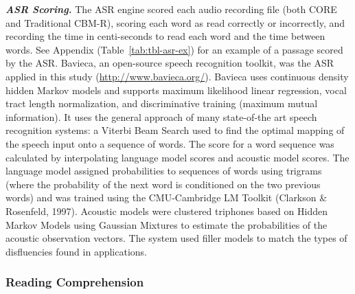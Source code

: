\documentclass[
  english,
  man, fleqn, noextraspace]{apa6}
\begin{document}
\begin{center}
\begin{ThreePartTable}
\end{ThreePartTable}
\end{center}




\textbf{\emph{ASR Scoring.}} The ASR engine scored each audio recording file (both CORE and Traditional CBM-R), scoring each word as read correctly or incorrectly, and recording the time in centi-seconds to read each word and the time between words. See Appendix (Table~\ref{tab:tbl-asr-ex}) for an example of a passage scored by the ASR. Bavieca, an open-source speech recognition toolkit, was the ASR applied in this study (\url{http://www.bavieca.org/}). Bavieca uses continuous density hidden Markov models and supports maximum likelihood linear regression, vocal tract length normalization, and discriminative training (maximum mutual information). It uses the general approach of many state-of-the art speech recognition systems: a Viterbi Beam Search used to find the optimal mapping of the speech input onto a sequence of words. The score for a word sequence was calculated by interpolating language model scores and acoustic model scores. The language model assigned probabilities to sequences of words using trigrams (where the probability of the next word is conditioned on the two previous words) and was trained using the CMU-Cambridge LM Toolkit (Clarkson \& Rosenfeld, 1997). Acoustic models were clustered triphones based on Hidden Markov Models using Gaussian Mixtures to estimate the probabilities of the acoustic observation vectors. The system used filler models to match the types of disfluencies found in applications.

\hypertarget{reading-comprehension}{%
\subsubsection{Reading Comprehension}\label{reading-comprehension}}
\end{document}
